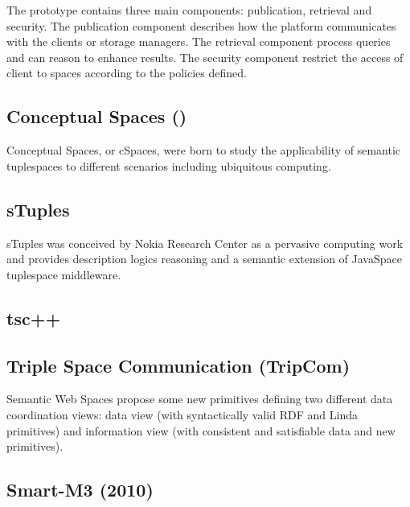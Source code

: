 The prototype contains three main components: publication, retrieval and security.
The publication component describes how the platform communicates with the clients or storage managers.
The retrieval component process queries and can reason to enhance results. %
The security component restrict the access of client to spaces according to the policies defined.  %


\subsection{Conceptual Spaces ()}

Conceptual Spaces, or cSpaces, were born to study the applicability of semantic tuplespaces to different scenarios including ubiquitous computing.


\subsection{sTuples}
 sTuples was conceived by Nokia Research Center as a pervasive
computing work and provides description logics reasoning and a semantic extension of JavaSpace tuplespace middleware.



\subsection{tsc++}


\subsection{Triple Space Communication (TripCom)}
Semantic Web Spaces propose some new primitives defining
two different data coordination views: data view (with syntactically valid RDF and Linda primitives) and information view
(with consistent and satisfiable data and new primitives).





\subsection{Smart-M3 (2010)}

